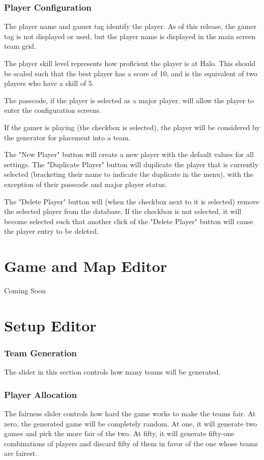 \documentclass[10pt,a4paper]{report}
\begin{document}
\subsection{Player Configuration}
The player name and gamer tag identify the player.  As of this release, the gamer tag is not displayed or used, but the player name is displayed in the main screen team grid.

The player skill level represents how proficient the player is at Halo.  This should be scaled such that the best player has a score of 10, and is the equivalent of two players who have a skill of 5.

The passcode, if the player is selected as a major player, will allow the player to enter the configuration screens.

If the gamer is playing (the checkbox is selected), the player will be considered by the generator for placement into a team.

The "New Player" button will create a new player with the default values for all settings.  The "Duplicate Player" button will duplicate the player that is currently selected (bracketing their name to indicate the duplicate in the menu), with the exception of their passcode and major player status.

The "Delete Player" button will (when the checkbox next to it is selected) remove the selected player from the database.  If the checkbox is not selected, it will become selected such that another click of the "Delete Player" button will cause the player entry to be deleted.

\chapter{Game and Map Editor}
Coming Soon

\chapter{Setup Editor}
\subsection{Team Generation}
The slider in this section controls how many teams will be generated.

\subsection{Player Allocation}
The fairness slider controls how hard the game works to make the teams fair.  At zero, the generated game will be completely random.  At one, it will generate two games and pick the more fair of the two.  At fifty, it will generate fifty-one combinations of players and discard fifty of them in favor of the one whose teams are fairest.
\end{document}

